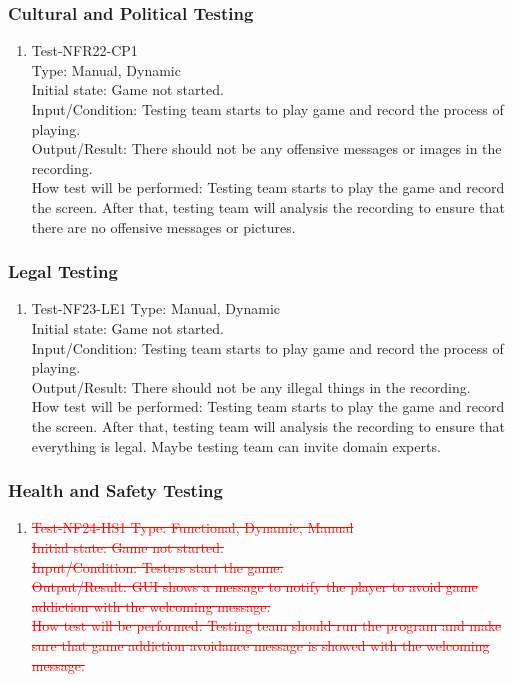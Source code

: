 \documentclass[12pt]{article}
\begin{document}
\subsubsection{Cultural and Political Testing}
\begin{enumerate}[1.]
\item Test-NFR22-CP1\\
Type: Manual, Dynamic\\
Initial state: Game not started.\\
Input/Condition: Testing team starts to play game
and record the process of playing.\\
Output/Result: There should not be any offensive
messages or images in the recording.\\
How test will be performed: Testing team starts to
play the game and record the screen. After that, 
testing team will analysis the recording to ensure
that there are no offensive messages or pictures.
\end{enumerate}
\subsubsection{Legal Testing}
\begin{enumerate}[1.]
\item Test-NF23-LE1
Type: Manual, Dynamic\\
Initial state: Game not started.\\
Input/Condition: Testing team starts to play game
and record the process of playing.\\
Output/Result: There should not be any illegal things in the recording.\\
How test will be performed: Testing team starts to
play the game and record the screen. After that, 
testing team will analysis the recording to ensure
that everything is legal. Maybe testing team can
invite domain experts.
\end{enumerate}
\subsubsection{Health and Safety Testing}
\begin{enumerate}[1.]
\item \textcolor{red}{\st{Test-NF24-HS1
Type: Functional, Dynamic, Manual\\
Initial state: Game not started.\\
Input/Condition: Testers start the game.\\
Output/Result: GUI shows a message to notify the 
player to avoid game addiction with the welcoming 
message.\\
How test will be performed: Testing team should 
run the program and make sure that game addiction
avoidance message is showed with the welcoming message.}}
\end{enumerate}
\end{document}
